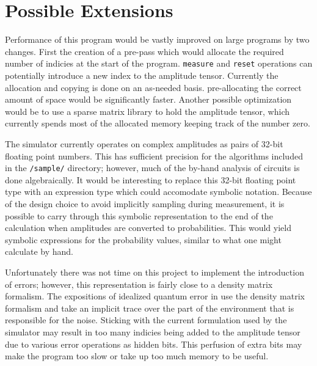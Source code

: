 \documentclass[%
 reprint,
 amsmath,amssymb,
 aps,
]{revtex4-2}
\begin{document}
\section{\label{sec:level1} Possible Extensions}
Performance of this program would be vastly improved on large programs by two changes. First the creation of a pre-pass which would allocate the required number of indicies at the start of the program. \texttt{measure} and \texttt{reset} operations can potentially introduce a new index to the amplitude tensor. Currently the allocation and copying is done on an as-needed basis. pre-allocating the correct amount of space would be significantly faster. Another possible optimization would be to use a sparse matrix library to hold the amplitude tensor, which currently spends most of the allocated memory keeping track of the number zero.

The simulator currently operates on complex amplitudes as pairs of 32-bit floating point numbers. This has sufficient precision for the algorithms included in the \texttt{/sample/} directory; however, much of the by-hand analysis of circuits is done algebraically. It would be interesting to replace this 32-bit floating point type with an expression type which could accomodate symbolic notation. Because of the design choice to avoid implicitly sampling during measurement, it is possible to carry through this symbolic representation to the end of the calculation when amplitudes are converted to probabilities. This would yield symbolic expressions for the probability values, similar to what one might calculate by hand.

Unfortunately there was not time on this project to implement the introduction of errors; however, this representation is fairly close to a density matrix formalism. The expositions of idealized quantum error in \cite{nielsenQuantum2010, lebellacShort2006} use the density matrix formalism and take an implicit trace over the part of the environment that is responsible for the noise. Sticking with the current formulation used by the simulator may result in too many indicies being added to the amplitude tensor due to various error operations as hidden bits. This perfusion of extra bits may make the program too slow or take up too much memory to be useful.

\nocite{*}

\end{document}
